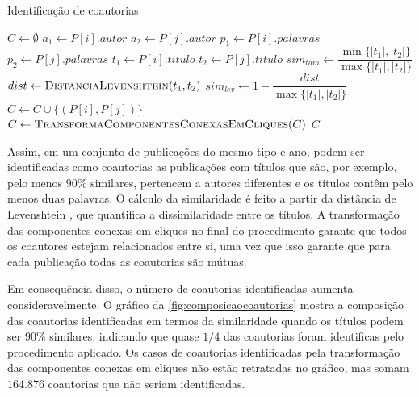 \begin{algorithm}
\caption{Identificação de coautorias}
\label{alg:coautoria}
\begin{algorithmic}[1]
    \State $C\gets \emptyset$
            \State $a_1 \gets P[i].autor$
            \State $a_2 \gets P[j].autor$
            \State $p_1 \gets P[i].palavras$
            \State $p_2 \gets P[j].palavras$
            \State $t_1 \gets P[i].titulo$
            \State $t_2 \gets P[j].titulo$
            \State $sim_{tam}\gets \dfrac{\min\{|t_1|, |t_2|\}}{\max\{|t_1|, |t_2|\}}$
                \State $dist\gets \Call{DistanciaLevenshtein}{t_1, t_2}$
                \State $sim_{lev}\gets 1 - \dfrac{dist}{\max\{|t_1|, |t_2|\}}$
                    \State $C\gets C\cup\{(P[i], P[j])\}$
                \EndIf
            \EndIf
        \EndFor
    \EndFor
    \State $C\gets \Call{TransformaComponentesConexasEmCliques}{C}$
    \State \Return $C$
\EndProcedure
\end{algorithmic}
\end{algorithm}

Assim, em um conjunto de publicações do mesmo tipo e ano, podem ser identificadas como coautorias as publicações com títulos que são, por exemplo, pelo menos $90$\% similares, pertencem a autores diferentes e os títulos contêm pelo menos duas palavras. O cálculo da similaridade é feito a partir da distância de Levenshtein \cite{levenshtein1965binary}, que quantifica a dissimilaridade entre os títulos. A transformação das componentes conexas em cliques no final do procedimento garante que todos os coautores estejam relacionados entre si, uma vez que isso garante que para cada publicação todas as coautorias são mútuas.

Em consequência disso, o número de coautorias identificadas aumenta consideravelmente. O gráfico da \autoref{fig:composicaocoautorias} mostra a composição das coautorias identificadas em termos da similaridade quando os títulos podem ser 90\% similares, indicando que quase $1/4$ das coautorias foram identificas pelo procedimento aplicado. Os casos de coautorias identificadas pela transformação das componentes conexas em cliques não estão retratadas no gráfico, mas somam $164.876$ coautorias que não seriam identificadas.

